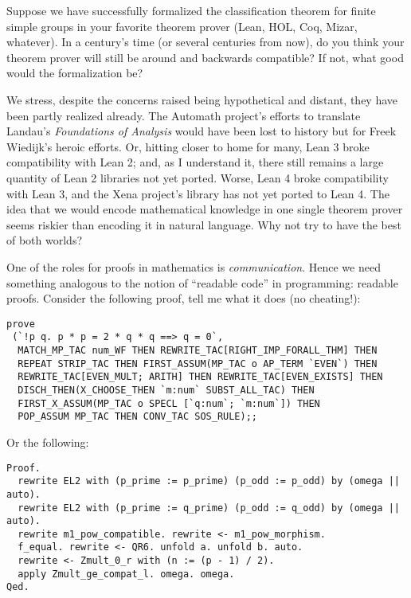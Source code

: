 \M
Suppose we have successfully formalized the classification theorem for
finite simple groups in your favorite theorem prover (Lean, HOL, Coq,
Mizar, whatever). In a century's time (or several centuries from now),
do you think your theorem prover will still be around and backwards
compatible? If not, what good would the formalization be?

\begin{remark}
We stress, despite the concerns raised being hypothetical and distant,
they have been partly realized already. The Automath project's
efforts to translate Landau's \emph{Foundations of Analysis} would have
been lost to history but for Freek Wiedijk's heroic efforts. Or, hitting
closer to home for many, Lean 3 broke compatibility with Lean 2; and, as
I understand it, there still remains a large quantity of Lean 2
libraries not yet ported. Worse, Lean 4 broke compatibility with Lean 3,
and the Xena project's library has not yet ported to Lean 4. The idea
that we would encode mathematical knowledge in one single theorem prover
seems riskier than encoding it in natural language. Why not try to have
the best of both worlds?
\end{remark}

One of the roles for proofs in mathematics is
\emph{communication}. Hence we need something analogous to the notion of
``readable code'' in programming: readable proofs. Consider the
following proof, tell me what it does (no cheating!):

\begin{Verbatim}
prove
 (`!p q. p * p = 2 * q * q ==> q = 0`,
  MATCH_MP_TAC num_WF THEN REWRITE_TAC[RIGHT_IMP_FORALL_THM] THEN
  REPEAT STRIP_TAC THEN FIRST_ASSUM(MP_TAC o AP_TERM `EVEN`) THEN
  REWRITE_TAC[EVEN_MULT; ARITH] THEN REWRITE_TAC[EVEN_EXISTS] THEN
  DISCH_THEN(X_CHOOSE_THEN `m:num` SUBST_ALL_TAC) THEN
  FIRST_X_ASSUM(MP_TAC o SPECL [`q:num`; `m:num`]) THEN
  POP_ASSUM MP_TAC THEN CONV_TAC SOS_RULE);;
\end{Verbatim}

Or the following:

\begin{Verbatim}
Proof.
  rewrite EL2 with (p_prime := p_prime) (p_odd := p_odd) by (omega || auto).
  rewrite EL2 with (p_prime := q_prime) (p_odd := q_odd) by (omega || auto).
  rewrite m1_pow_compatible. rewrite <- m1_pow_morphism.
  f_equal. rewrite <- QR6. unfold a. unfold b. auto.
  rewrite <- Zmult_0_r with (n := (p - 1) / 2).
  apply Zmult_ge_compat_l. omega. omega.
Qed.
\end{Verbatim}

